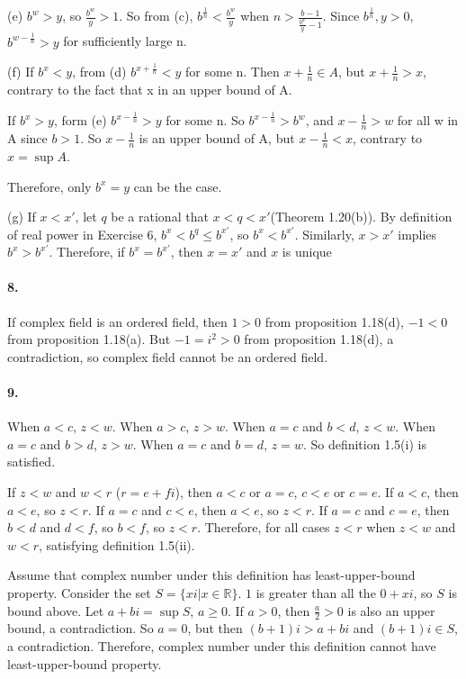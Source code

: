 \documentclass[a4paper]{article}
\begin{document}
(e)
$b^w>y$, so $\frac{b^w}{y}>1$. So from (c), $b^{\frac{1}{n}}<\frac{b^w}{y}$ when $n>\frac{b-1}{\frac{b^w}{y}-1}$. Since $b^{\frac{1}{n}},y>0$, $b^{w-\frac{1}{n}}>y$ for sufficiently large n.
\medskip

(f)
If $b^x<y$, from (d) $b^{x+\frac{1}{n}}<y$ for some n. Then $x+\frac{1}{n}\in A$, but $x+\frac{1}{n}>x$, contrary to the fact that x in an upper bound of A.

If $b^x>y$, form (e) $b^{x-\frac{1}{n}}>y$ for some n. So $b^{x-\frac{1}{n}}>b^w$, and $x-\frac{1}{n}>w$ for all w in A since $b>1$. So $x-\frac{1}{n}$ is an upper bound of A, but $x-\frac{1}{n}<x$, contrary to $x=\sup A$.

Therefore, only $b^x=y$ can be the case.
\medskip

(g)
If $x<x'$, let $q$ be a rational that $x<q<x'$(Theorem 1.20(b)). By definition of real power in Exercise 6, $b^x<b^q\leq b^{x'}$, so $b^x<b^{x'}$. Similarly, $x>x'$ implies $b^x>b^{x'}$. Therefore, if $b^x=b^{x'}$, then $x=x'$ and $x$ is unique

\paragraph{8.}
If complex field is an ordered field, then $1>0$ from proposition 1.18(d), $-1<0$ from proposition 1.18(a). But $-1=i^2>0$ from proposition 1.18(d), a contradiction, so complex field cannot be an ordered field.

\paragraph{9.}
When $a<c$, $z<w$. When $a>c$, $z>w$. When $a=c$ and $b<d$, $z<w$. When $a=c$ and $b>d$, $z>w$. When $a=c$ and $b=d$, $z=w$. So definition 1.5(i) is satisfied.

If $z<w$ and $w<r$ ($r=e+fi$), then $a<c$ or $a=c$, $c<e$ or $c=e$. If $a<c$, then $a<e$, so $z<r$. If $a=c$ and $c<e$, then $a<e$, so $z<r$. If $a=c$ and $c=e$, then $b<d$ and $d<f$, so $b<f$, so $z<r$. Therefore, for all cases $z<r$ when $z<w$ and $w<r$, satisfying definition 1.5(ii).
\medskip

Assume that complex number under this definition has least-upper-bound property. Consider the set $S=\{xi|x\in\mathbb{R}\}$. $1$ is greater than all the $0+xi$, so $S$ is bound above. Let $a+bi=\sup S$, $a\geq0$. If $a>0$, then $\frac{a}{2}>0$ is also an upper bound, a contradiction. So $a=0$, but then $(b+1)i>a+bi$ and $(b+1)i\in S$, a contradiction. Therefore, complex number under this definition cannot have least-upper-bound property.
\end{document}

